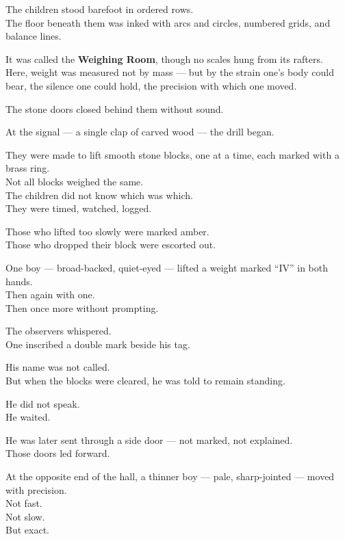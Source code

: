 \documentclass[12pt]{article}
\begin{document}
The children stood barefoot in ordered rows.\\
The floor beneath them was inked with arcs and circles, numbered grids, and balance lines.

It was called the \textbf{Weighing Room}, though no scales hung from its rafters.\\
Here, weight was measured not by mass — but by the strain one’s body could bear, the silence one could hold, the precision with which one moved.

The stone doors closed behind them without sound.

\vspace{1em}

At the signal — a single clap of carved wood — the drill began.

They were made to lift smooth stone blocks, one at a time, each marked with a brass ring.\\
Not all blocks weighed the same.\\
The children did not know which was which.\\
They were timed, watched, logged.

Those who lifted too slowly were marked amber.\\
Those who dropped their block were escorted out.

\vspace{1em}

One boy — broad-backed, quiet-eyed — lifted a weight marked “IV” in both hands.\\
Then again with one.\\
Then once more without prompting.

The observers whispered.\\
One inscribed a double mark beside his tag.

His name was not called.\\
But when the blocks were cleared, he was told to remain standing.

He did not speak.\\
He waited.

He was later sent through a side door — not marked, not explained.\\
Those doors led forward.

\vspace{1em}

At the opposite end of the hall, a thinner boy — pale, sharp-jointed — moved with precision.\\
Not fast.\\
Not slow.\\
But exact.
\end{document}
